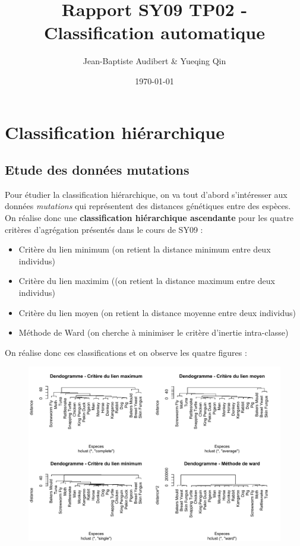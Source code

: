 \documentclass[a4paper,11pt]{article}
\title{Rapport SY09 TP02 - Classification automatique}
\author{Jean-Baptiste Audibert \& Yueqing Qin}
\date{\today}
\begin{document}
\maketitle

\section{Classification hiérarchique}

\subsection{Etude des données mutations}

\noindent Pour étudier la classification hiérarchique, on va tout d'abord s'intéresser aux données \textit{mutations} qui représentent des distances génétiques entre des espèces. On réalise donc une \textbf{classification hiérarchique ascendante} pour les quatre critères d'agrégation présentés dans le cours de SY09 : \\

\begin{itemize}
\item Critère du lien minimum (on retient la distance minimum entre deux individus)
\item Critère du lien maximim ((on retient la distance maximum entre deux individus)
\item Critère du lien moyen (on retient la distance moyenne entre deux individus)
\item Méthode de Ward (on cherche à minimiser le critère d'inertie intra-classe) \\
\end{itemize}

\noindent On réalise donc ces classifications et on observe les quatre figures : 

\begin{figure}[H]
\begin{center}
\includegraphics[width=.8\textwidth]{img/4dendo.pdf}
\end{center}
\end{figure}
\end{document}
